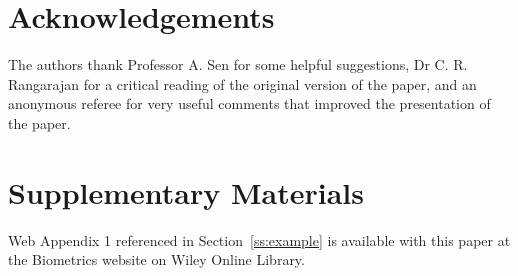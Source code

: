 \documentclass[useAMS,usenatbib,referee]{example/biom}
\begin{document}
\backmatter


\section*{Acknowledgements}

The authors thank Professor A. Sen for some helpful suggestions,
Dr C. R. Rangarajan for a critical reading of the original version of the
paper, and an anonymous referee for very useful comments that improved
the presentation of the paper.\vspace*{-8pt}


\section*{Supplementary Materials}

Web Appendix 1 referenced in Section~\ref{ss:example} is available
with this paper at the Biometrics website on Wiley Online Library.
\vspace*{-8pt}
\end{document}
